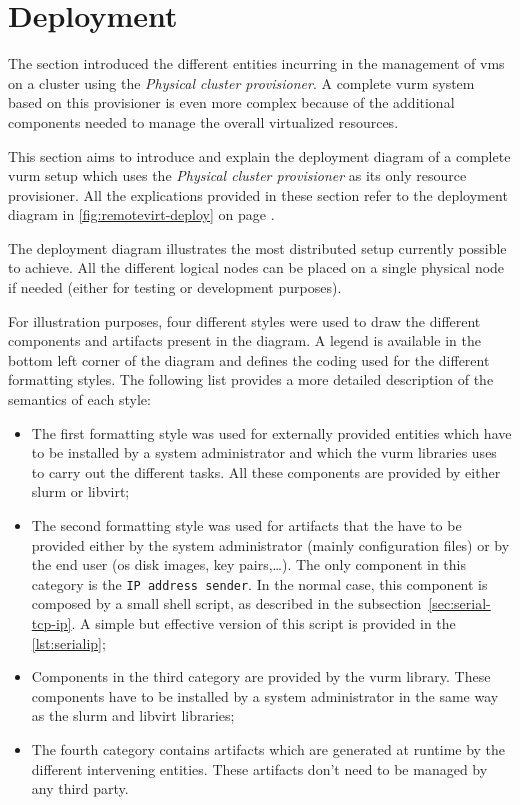 \section{Deployment}
\label{sec:cluster-deployment}

The \emph{} section introduced the different entities incurring in the management of \glspl{vm} on a cluster using the \emph{Physical cluster provisioner}. A complete \gls{vurm} system based on this provisioner is even more complex because of the additional components needed to manage the overall virtualized resources.

This section aims to introduce and explain the deployment diagram of a complete \gls{vurm} setup which uses the \emph{Physical cluster provisioner} as its only resource provisioner. All the explications provided in these section refer to the deployment diagram in \autoref{fig:remotevirt-deploy} on page \pageref{fig:remotevirt-deploy}.

The deployment diagram illustrates the most distributed setup currently possible to achieve. All the different logical nodes can be placed on a single physical node if needed (either for testing or development purposes).

For illustration purposes, four different styles were used to draw the different components and artifacts present in the diagram. A legend is available in the bottom left corner of the diagram and defines the coding used for the different formatting styles. The following list provides a more detailed description of the semantics of each style:

\begin{itemize}
	\item The first formatting style was used for externally provided entities which have to be installed by a system administrator and which the \gls{vurm} libraries uses to carry out the different tasks. All these components are provided by either \gls{slurm} or libvirt;
	\item The second formatting style was used for artifacts that the have to be provided either by the system administrator (mainly configuration files) or by the end user (\gls{os} disk images, key pairs,…). The only component in this category is the \texttt{IP address sender}. In the normal case, this component is composed by a small shell script, as described in the subsection~\ref{sec:serial-tcp-ip}. A simple but effective version of this script is provided in the \autoref{lst:serialip};
	\item Components in the third category are provided by the \gls{vurm} library. These components have to be installed by a system administrator in the same way as the \gls{slurm} and libvirt libraries;
	\item The fourth category contains artifacts which are generated at runtime by the different intervening entities. These artifacts don't need to be managed by any third party.
\end{itemize}

